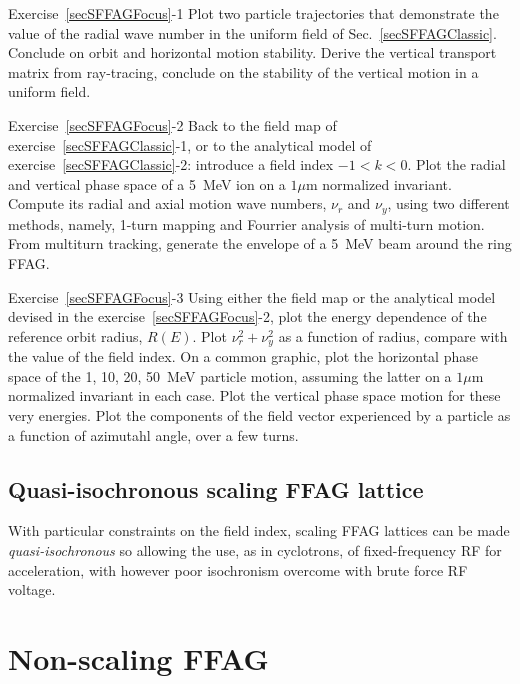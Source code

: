\smallskip
\noindent {\small $\bullet$} Exercise~\ref{secSFFAGFocus}-1
Plot two particle trajectories that demonstrate the value of the radial wave number in the uniform 
field of Sec.~\ref{secSFFAGClassic}. Conclude on orbit and horizontal motion  stability. 
Derive the  vertical  transport matrix from ray-tracing, conclude on the stability of the vertical motion
in a uniform field.


\smallskip
\noindent {\small $\bullet$} Exercise~\ref{secSFFAGFocus}-2
Back to the field map of exercise~\ref{secSFFAGClassic}-1, or to the analytical model 
of exercise~\ref{secSFFAGClassic}-2: introduce a field index $-1<k<0$. 
Plot the radial and vertical phase space of a 5~MeV ion on a $1\mu$m normalized invariant.  
Compute its radial and axial motion wave numbers, $\nu_r$ and $\nu_y$, 
using two different methods, namely, 1-turn mapping and  Fourrier analysis of multi-turn motion. 
From multiturn tracking, generate the envelope of a 5~MeV beam around the ring FFAG.  


\smallskip
\noindent {\small $\bullet$} Exercise~\ref{secSFFAGFocus}-3
Using either the field map or the analytical model devised in the  exercise~\ref{secSFFAGFocus}-2, 
 plot the energy dependence of the reference orbit radius, $R(E)$. 
Plot  $\nu_r^2 + \nu_y^2$ as a function of radius, compare with the value of the field index. 
On a common graphic, plot the horizontal phase space of the 1, 10, 20, 50~MeV particle motion,
assuming the latter on a $1\mu$m normalized invariant in each case.
Plot the vertical phase space motion for these very energies. 
Plot the components of the field vector experienced by a particle as a function of 
azimutahl angle, over a few turns.


\subsection{Quasi-isochronous scaling FFAG lattice \label{SecSFFAGQuasiIsoCrhro}}

With particular constraints on the field index, 
scaling FFAG lattices can be made \textsl{quasi-isochronous} so allowing the use, as in cyclotrons, of fixed-frequency RF 
for acceleration, with however poor isochronism overcome with brute force RF voltage. 




\section{Non-scaling FFAG \label{secNSFFAG}}



